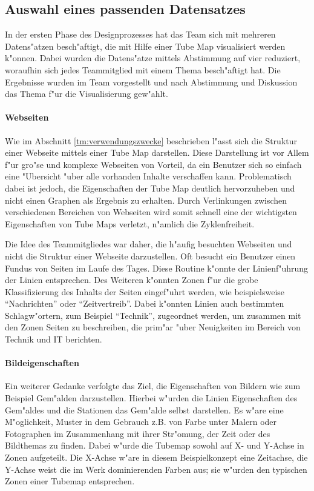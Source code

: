 \subsection{Auswahl eines passenden Datensatzes}
In der ersten Phase des Designprozesses hat das Team sich mit mehreren Datens"atzen besch"aftigt, die mit Hilfe einer Tube Map visualisiert werden k"onnen. Dabei wurden die Datens"atze mittels Abstimmung auf vier reduziert, woraufhin sich jedes Teammitglied mit einem Thema besch"aftigt hat. Die Ergebnisse wurden im Team vorgestellt und nach Abstimmung und Diskussion das Thema f"ur die Visualisierung gew"ahlt.

\paragraph{Webseiten}
Wie im Abschnitt \ref{tm:verwendungszwecke} beschrieben l"asst sich die Struktur einer Webseite mittels einer Tube Map darstellen.  Diese Darstellung ist vor Allem f"ur gro"se und komplexe Webseiten von Vorteil, da ein Benutzer sich so einfach eine "Ubersicht "uber alle vorhanden Inhalte verschaffen kann. Problematisch dabei ist jedoch, die Eigenschaften der Tube Map deutlich hervorzuheben und nicht einen Graphen als Ergebnis zu erhalten. Durch Verlinkungen zwischen verschiedenen Bereichen von Webseiten wird somit schnell eine der wichtigsten Eigenschaften von Tube Maps verletzt, n"amlich die Zyklenfreiheit.

Die Idee des Teammitgliedes war daher, die h"aufig besuchten Webseiten und nicht die Struktur einer Webseite darzustellen. Oft besucht ein Benutzer einen Fundus von Seiten im Laufe des Tages. Diese Routine k"onnte der Linienf"uhrung der Linien entsprechen. Des Weiteren k"onnten Zonen f"ur die grobe Klassifizierung des Inhalts der Seiten eingef"uhrt werden, wie beispielsweise "`Nachrichten"' oder "`Zeitvertreib"'. Dabei k"onnten Linien auch bestimmten Schlagw"ortern, zum Beispiel "`Technik"', zugeordnet werden, um zusammen mit den Zonen Seiten zu beschreiben, die prim"ar "uber Neuigkeiten im Bereich von Technik und IT berichten. 

\paragraph{Bildeigenschaften}
Ein weiterer Gedanke verfolgte das Ziel, die Eigenschaften von Bildern wie zum Beispiel Gem"alden darzustellen. Hierbei w"urden die Linien Eigenschaften des Gem"aldes und die Stationen das Gem"alde selbst darstellen. Es w"are eine M"oglichkeit, Muster in dem Gebrauch z.B. von Farbe unter Malern oder Fotographen im Zusammenhang mit ihrer Str"omung, der Zeit oder des Bildthemas zu finden. Dabei w"urde die Tubemap sowohl auf X- und Y-Achse in Zonen aufgeteilt. Die X-Achse w"are in diesem Beispielkonzept eine Zeitachse, die Y-Achse weist die im Werk dominierenden Farben aus; sie w"urden den typischen Zonen einer Tubemap entsprechen.

